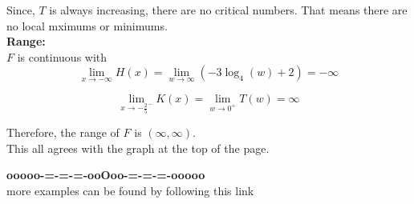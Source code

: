 \documentclass{ximera}
\begin{document}
Since, $T$ is always increasing, there are no critical numbers.  That means there are no local mximums or minimums. \\












\textbf{\textcolor{blue!55!black}{Range:}} \\


$F$ is continuous with \\




\[
\lim\limits_{x \to -\infty} H(x)  = \lim\limits_{w \to \infty} (-3 \log_4(w) + 2)  = -\infty
\]



\[
\lim\limits_{x \to -\frac{2}{5}^-} K(x)  = \lim\limits_{w \to 0^+} T(w) = \infty
\]


Therefore, the range of $F$ is $(\infty, \infty)$.\\





This all agrees with the graph at the top of the page. 






















\begin{center}
\textbf{\textcolor{green!50!black}{ooooo-=-=-=-ooOoo-=-=-=-ooooo}} \\

more examples can be found by following this link\\ 

\end{center}
\end{document}
